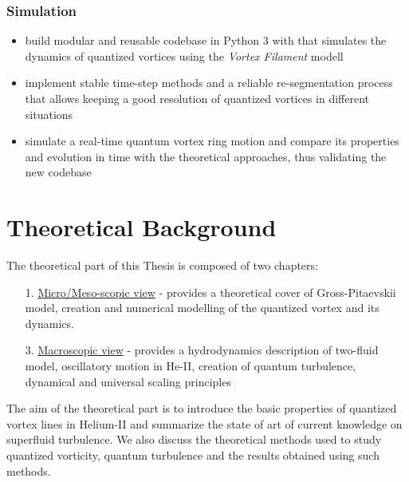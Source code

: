 	\subsection*{Simulation}
	\begin{itemize}
		\item build modular and reusable codebase in Python 3 with that simulates the dynamics of quantized vortices using the \textit{Vortex Filament} modell
		\item implement stable time-step methods and a reliable re-segmentation process that allows keeping a good resolution of quantized vortices in different situations
		\item simulate a real-time quantum vortex ring motion and compare its properties and evolution in time with the theoretical approaches, thus validating the new codebase
	\end{itemize}

\newpage


\chapter{Theoretical Background}

The theoretical part of this Thesis is composed of two chapters:

\begin{itemize}
	\item[1.] \underline{Micro/Meso-scopic view} - provides a theoretical cover of Gross-Pitaevskii model, creation and numerical modelling of the quantized vortex and its dynamics.

	\item[3.] \underline{Macroscopic view} - provides a hydrodynamics description of two-fluid model, oscillatory motion in He-II, creation of quantum turbulence, dynamical and universal scaling principles

\end{itemize}

The aim of the theoretical part is to introduce the basic properties of quantized vortex lines in Helium-II and summarize the state of art of current knowledge on superfluid turbulence. We also discuss the theoretical methods used to study quantized vorticity, quantum turbulence and the results obtained using such methods.

